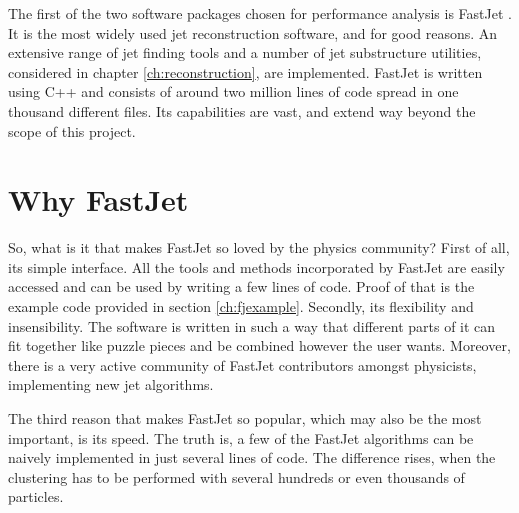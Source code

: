 The first of the two software packages chosen for performance analysis is FastJet \cite{fastjet_site}. It is the most widely used jet reconstruction software, and for good reasons. An extensive range of jet finding tools and a number of jet substructure utilities, considered in chapter \ref{ch:reconstruction}, are implemented. FastJet is written using C++ and consists of around two million lines of code spread in one thousand different files. Its capabilities are vast, and extend way beyond the scope of this project.

\section{Why FastJet}\label{ch:whyfj}
So, what is it that makes FastJet so loved by the physics community? First of all, its simple interface. All the tools and methods incorporated by FastJet are easily accessed and can be used by writing a few lines of code. Proof of that is the  example code provided in section \ref{ch:fjexample}. Secondly, its flexibility and insensibility. The software is written in such a way that different parts of it can fit together like puzzle pieces and be combined however the user wants. Moreover, there is a very active community of FastJet contributors amongst physicists, implementing new jet algorithms. 



The third reason that makes FastJet so popular, which may also be the most important, is its speed. The truth is, a few of the FastJet algorithms can be naively implemented in just several lines of code. The difference rises, when the clustering has to be performed with several hundreds or even thousands of particles. 

